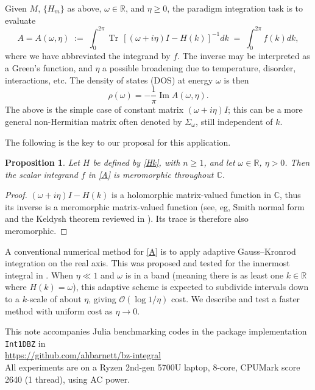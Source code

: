 \documentclass[11pt]{article}
\newcommand{\be}{\begin{equation}}
\newcommand{\ee}{\end{equation}}
\newcommand{\bigO}{{\mathcal O}}
\newcommand{\R}{\mathbb{R}}
\newcommand{\C}{\mathbb{C}}
\DeclareMathOperator{\im}{Im}
\DeclareMathOperator{\tr}{Tr}
\newtheorem{pro}[thm]{Proposition}
\newtheorem{rmk}[thm]{Remark}
\newcommand{\om}{\omega}
\begin{document}
Given $M$, $\{H_m\}$ as above, $\om\in \R$, and $\eta\ge0$,
the paradigm integration task is to evaluate
\be
A = A(\om,\eta) \;:=\;
\int_{0}^{2\pi} \tr\, [(\om +i\eta)I - H(k)]^{-1} dk
\; = \;
\int_{0}^{2\pi} f(k) dk,
\label{A}
\ee
where we have abbreviated the integrand by $f$.
The inverse may be interpreted as a Green's function, and $\eta$
a possible broadening due to temperature, disorder, interactions, etc.
The density of states (DOS) at energy $\om$ is then
\be
\rho(\om) = -\frac{1}{\pi}\im A(\om,\eta).
\label{DOS}
\ee
The above is the simple case of constant matrix $(\om+i\eta)I$; this
can be a more general non-Hermitian matrix often denoted by
$\Sigma_\om$, still independent of $k$.

The following is the key to our proposal for this application.
\begin{pro}
  Let $H$ be defined by \eqref{Hk}, with $n\ge 1$, and let $\om\in\R$, $\eta>0$.
  Then the scalar integrand $f$ in \eqref{A} is meromorphic throughout $\C$.
\end{pro}
\begin{proof}
  $(\omega+i\eta)I - H(k)$ is a holomorphic matrix-valued function in $\C$,
  thus its inverse is a meromorphic matrix-valued function
  (see, eg, Smith normal form and the Keldysh theorem reviewed in
  \cite{beyn12,NEVPrev}).
  Its trace is therefore also meromorphic.
\end{proof}

A conventional numerical method for \eqref{A} is
to apply adaptive Gauss--Kronrod integration on the real axis.
This was proposed and tested for the innermost integral in \cite{autobz}.
When $\eta\ll1$ and $\om$ is in a band (meaning there is as least one
$k\in\R$ where $H(k)=\om$), this adaptive scheme is expected
to subdivide intervals down to a $k$-scale of about $\eta$, giving $\bigO(\log 1/\eta)$ cost.
We describe and test a faster method with uniform cost as $\eta\to 0$.

This note accompanies Julia benchmarking codes in the package implementation
\texttt{Int1DBZ} in\\
  \url{https://github.com/ahbarnett/bz-integral}\\
  All experiments are on a Ryzen 2nd-gen 5700U laptop, 8-core, CPUMark score 2640 (1 thread), using AC power.
\end{document}

